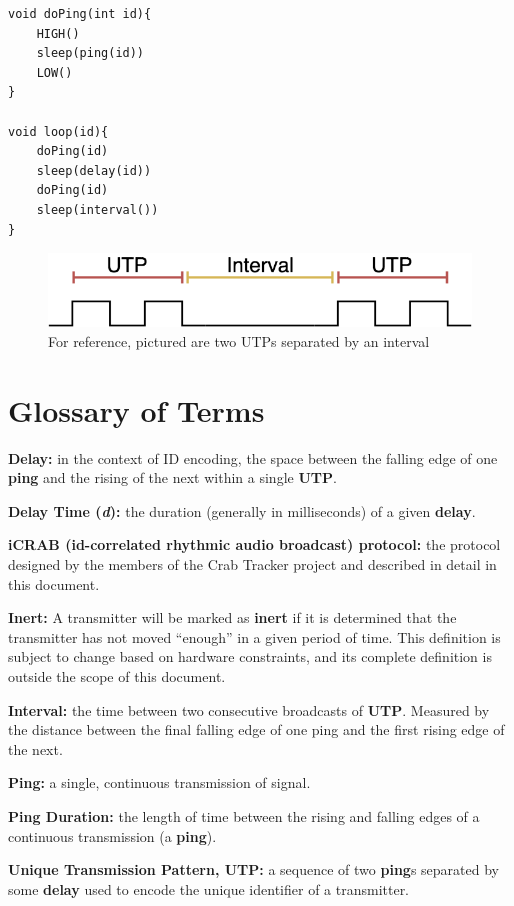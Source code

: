 \documentclass[12pt]{article}
\begin{document}
\begin{lstlisting}[caption={Transmitter Behavior},label={lst:tx}]
void doPing(int id){
	HIGH()
	sleep(ping(id))
	LOW()
}

void loop(id){
	doPing(id)
	sleep(delay(id))
	doPing(id)
	sleep(interval())
}
\end{lstlisting}

\begin{figure}[h]
\centering
\includegraphics[scale=0.5]{interval}

\caption{For reference, pictured are two UTPs separated by an interval}
\label{fig:interval}
\end{figure}


\newpage
\appendix
\section{Glossary of Terms} \label{glossary}

{\bf Delay:}
	in the context of ID encoding, the space between the falling edge of one
	{\bf ping} and the rising of the next within a single {\bf UTP}.

{\bf Delay Time ({\em d}):}
	the duration (generally in milliseconds) of a given {\bf delay}.

{\bf iCRAB (id-correlated rhythmic audio broadcast) protocol:}
	the protocol designed by the members of the Crab Tracker project and
	described in detail in this document.

{\bf Inert:}
	A transmitter will be marked as {\bf inert} if it is determined that the
	transmitter has not moved ``enough'' in a given period of time.
	This definition is subject to change based on hardware constraints,
	and its complete definition is outside the scope of this document.

{\bf Interval:}
	the time between two consecutive broadcasts of {\bf UTP}. Measured by the
	distance between the final falling edge of one ping and the first rising
	edge of the next.

{\bf Ping:}
	a single, continuous transmission of signal.

{\bf Ping Duration:}
	the length of time between the rising and falling edges of a continuous
	transmission (a {\bf ping}).

{\bf Unique Transmission Pattern, UTP:}
	a sequence of two {\bf ping}s separated by some {\bf delay} used to
	encode the unique identifier of a transmitter.
\end{document}
